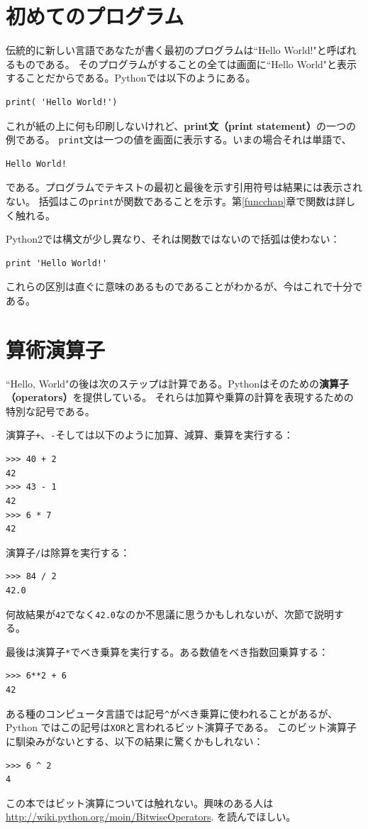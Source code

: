 \documentclass[a4j,12pt,makeidx]{jbook}
\begin{document}
\section{初めてのプログラム}
\label{hello}
%
伝統的に新しい言語であなたが書く最初のプログラムは``Hello World!"と呼ばれるものである。
そのプログラムがすることの全ては画面に``Hello World"と表示することだからである。Pythonでは以下のようにある。
\begin{verbatim}
print( 'Hello World!')
\end{verbatim}
これが紙の上に何も印刷しないけれど、{\bf print文（print statement）}の一つの例である。
{\tt print}文は一つの値を画面に表示する。いまの場合それは単語で、
\begin{verbatim}
Hello World!
\end{verbatim}
である。プログラムでテキストの最初と最後を示す引用符号は結果には表示されない。
括弧はこの{\tt print}が関数であることを示す。第{\ref{funcchap}}章で関数は詳しく触れる。\par
{} 
Python2では構文が少し異なり、それは関数ではないので括弧は使わない： 
\begin{verbatim}
print 'Hello World!'
\end{verbatim}
これらの区別は直ぐに意味のあるものであることがわかるが、今はこれで十分である。
%
\section{算術演算子}
``Hello, World"の後は次のステップは計算である。Pythonはそのための{\bf 演算子（operators）}を提供している。
それらは加算や乗算の計算を表現するための特別な記号である。\par
演算子{\tt +}、{\tt -}そして{\tt *}は以下のように加算、減算、乗算を実行する：
\begin{verbatim}
>>> 40 + 2
42
>>> 43 - 1
42
>>> 6 * 7
42
\end{verbatim}
演算子{\tt /}は除算を実行する：
\begin{verbatim}
>>> 84 / 2
42.0
\end{verbatim}
何故結果が{\tt 42}でなく{\tt 42.0}なのか不思議に思うかもしれないが、次節で説明する。 \par
最後は演算子{\tt **}でべき乗算を実行する。ある数値をべき指数回乗算する：
\begin{verbatim}
>>> 6**2 + 6
42
\end{verbatim}
ある種のコンピュータ言語では記号{\verb"^"}がべき乗算に使われることがあるが、Python
ではこの記号は{\tt XOR}と言われるビット演算子である。
このビット演算子に馴染みがないとする、以下の結果に驚くかもしれない：
\begin{verbatim}
>>> 6 ^ 2
4
\end{verbatim}
この本ではビット演算については触れない。興味のある人は \url{http://wiki.python.org/moin/BitwiseOperators}.
を読んでほしい。
%
\end{document}
